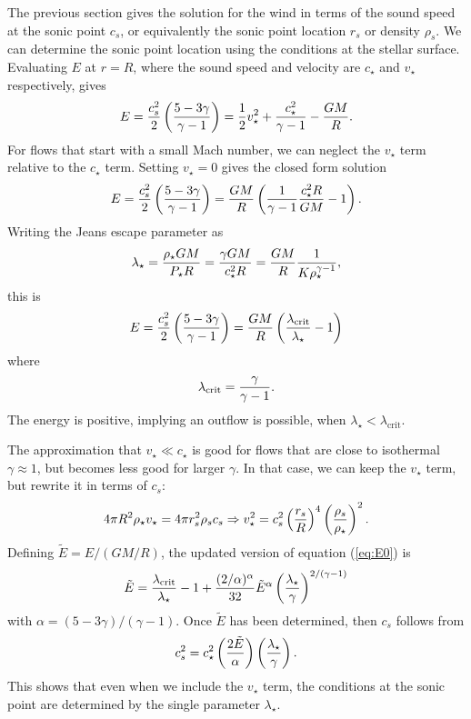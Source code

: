 \documentclass[preprint,12pt]{aastex}
\begin{document}
The previous section gives the solution for the wind in terms of the sound speed at the sonic point $c_s$, or equivalently the sonic point location $r_s$ or density $\rho_s$. We can determine the sonic point location using the conditions at the stellar surface. Evaluating $E$ at $r=R$, where the sound speed and velocity are $c_\star$ and $v_\star$ respectively, gives
\begin{equation}\label{eq:Ewithv}
E = {c_s^2\over 2}\left({5-3\gamma\over \gamma-1}\right) = {1\over 2}v_\star^2 + {c_\star^2\over \gamma-1} - {GM\over R}.
\end{equation}
For flows that start with a small Mach number, we can neglect the $v_\star$ term relative to the $c_\star$ term. Setting $v_\star =0$ gives the closed form solution
\begin{equation}
E = {c_s^2\over 2}\left({5-3\gamma\over \gamma-1}\right) = {GM\over R}\left({1\over \gamma-1}{c_\star^2 R\over GM}-1\right).
\end{equation}
Writing the Jeans escape parameter as 
\begin{equation}
\lambda_\star = {\rho_\star GM\over P_\star R} = {\gamma GM\over c_\star^2 R} = {GM\over R} {1\over K\rho_\star^{\gamma-1}},
\end{equation}
this is
\begin{equation}\label{eq:E0}
E = {c_s^2\over 2}\left({5-3\gamma\over \gamma-1}\right) = {GM\over R}\left({\lambda_\mathrm{crit}\over \lambda_\star}-1\right)
\end{equation}
where
\begin{equation}
\lambda_\mathrm{crit} = {\gamma\over\gamma-1}.
\end{equation}
The energy is positive, implying an outflow is possible, when $\lambda_\star < \lambda_\mathrm{crit}$.

The approximation that $v_\star\ll c_\star$ is good for flows that are close to isothermal $\gamma\approx 1$, but becomes less good for larger $\gamma$. In that case, we can keep the $v_\star$ term, but rewrite it in terms of $c_s$:
\begin{equation}
4\pi R^2\rho_\star v_\star = 4\pi r_s^2 \rho_s c_s\Rightarrow v_\star^2 = c_s^2 \left({r_s\over R}\right)^4\left({\rho_s\over \rho_\star}\right)^2.
\end{equation}
Defining $\tilde{E} = E/ (GM/R)$, the updated version of equation (\ref{eq:E0}) is
\begin{equation}\label{eq:tildeEeqn}
\tilde{E} = {\lambda_\mathrm{crit}\over \lambda_\star}-1 + {(2/\alpha)^\alpha\over 32}\tilde{E}^\alpha \left({\lambda_\star\over \gamma}\right)^{2/(\gamma-1)}
\end{equation}
with $\alpha = (5-3\gamma)/(\gamma-1)$. Once $\tilde{E}$ has been determined, then $c_s$ follows from
\begin{equation}\label{eq:cseqn}
c_s^2 = c_\star^2 \left({2\tilde{E}\over \alpha}\right)\left({\lambda_\star\over\gamma}\right).
\end{equation}
This shows that even when we include the $v_\star$ term, the conditions at the sonic point are determined by the single parameter $\lambda_\star$. 
\end{document}
